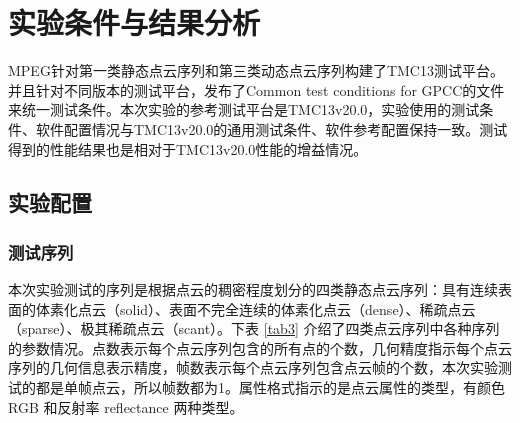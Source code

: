 \documentclass[bachelor,print,msfonts]{xduthesis}
\begin{document}
\mainmatter
\fi

\chapter{实验条件与结果分析}
\label{cha:frontmatter}
MPEG针对第一类静态点云序列和第三类动态点云序列构建了TMC13测试平台。并且针对不同版本的测试平台，发布了Common test conditions for GPCC\cite{ref23}的文件来统一测试条件。本次实验的参考测试平台是TMC13v20.0，实验使用的测试条件、软件配置情况与TMC13v20.0的通用测试条件、软件参考配置保持一致。测试得到的性能结果也是相对于TMC13v20.0性能的增益情况。
\section{实验配置}
\subsection{测试序列}
本次实验测试的序列是根据点云的稠密程度划分的四类静态点云序列：具有连续表面的体素化点云（solid）、表面不完全连续的体素化点云（dense）、稀疏点云（sparse）、极其稀疏点云（scant）。下表 \ref{tab3} 介绍了四类点云序列中各种序列的参数情况。点数表示每个点云序列包含的所有点的个数，几何精度指示每个点云序列的几何信息表示精度，帧数表示每个点云序列包含点云帧的个数，本次实验测试的都是单帧点云，所以帧数都为1。属性格式指示的是点云属性的类型，有颜色 RGB 和反射率 reflectance 两种类型。
\end{document}
